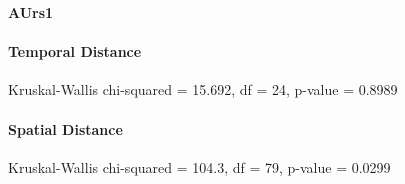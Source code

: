 



\large
\centerline{\textbf{AUrs1}}
\normalsize

\paragraph{Temporal Distance}
Kruskal-Wallis chi-squared = 15.692, df = 24, p-value = 0.8989

\paragraph{Spatial Distance}
Kruskal-Wallis chi-squared = 104.3, df = 79, p-value = 0.0299


